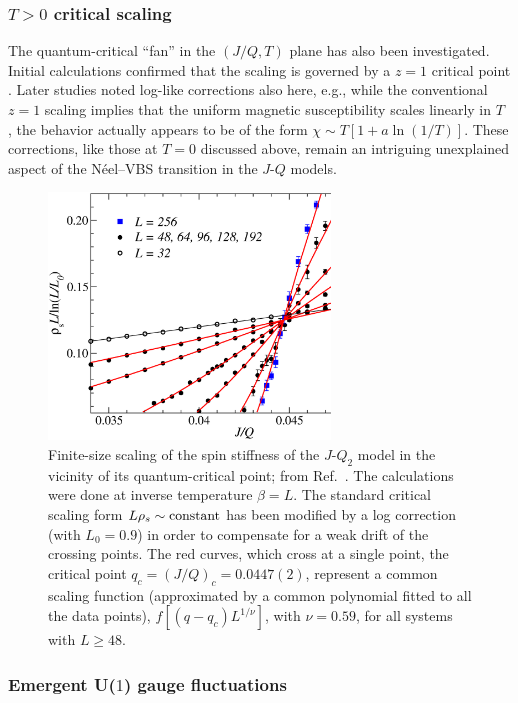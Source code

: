 \documentclass[10pt,pre,aps,twocolumn,showpacs,subscriptaddresses,floatfix]{revtex4}
\begin{document}
\subsubsection{$T>0$ critical scaling} The quantum-critical ``fan'' in the $(J/Q,T)$ plane has also been investigated. Initial calculations confirmed that
the scaling is governed by a $z=1$ critical point \cite{melko2008:jq}. Later studies \cite{Sandvik10c,Sandvik11a} noted log-like corrections also here, e.g., 
while the conventional $z=1$ scaling implies that the uniform magnetic susceptibility scales linearly in $T$ \cite{Chakravarty89}, the behavior actually appears 
to be of the form $\chi \sim T[1+a\ln(1/T)]$. These corrections, like those at $T=0$ discussed above, remain an intriguing unexplained aspect of the N\'eel--VBS 
transition in the $J$-$Q$ models.

\begin{figure}
\includegraphics[width=7.5cm, clip]{fig04.eps}
\caption{Finite-size scaling of the spin stiffness of the $J$-$Q_2$ model in the vicinity of its quantum-critical point; from Ref.~\cite{Sandvik10c}. The 
calculations were done at inverse temperature $\beta=L$. The standard critical scaling form $L\rho_s \sim {\rm constant}$ has been modified by a log correction 
(with $L_0=0.9$) in order to compensate for a weak drift of the crossing points. The red curves, which cross at a single point, the critical point $q_c=(J/Q)_c = 0.0447(2)$, 
represent a common scaling function (approximated by a common polynomial fitted to all the data points), $f[(q-q_c)L^{1/\nu}]$, with $\nu=0.59$, for all systems 
with $L\ge 48$.}
\label{jqrhos}
\end{figure}

\subsubsection{Emergent U($1$) gauge fluctuations}
\end{document}
